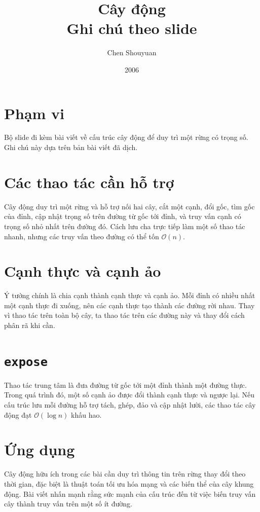 \documentclass[11pt]{article}
\title{Cây động\\{\large Ghi chú theo slide}}
\author{Chen Shouyuan}
\date{2006}
\newcommand{\Oh}{\mathcal{O}}
\begin{document}
\maketitle


\section{Phạm vi}

Bộ slide đi kèm bài viết về cấu trúc cây động để duy trì một rừng có trọng
số. Ghi chú này dựa trên bản bài viết đã dịch.

\section{Các thao tác cần hỗ trợ}

Cây động duy trì một rừng và hỗ trợ nối hai cây, cắt một cạnh, đổi gốc, tìm
gốc của đỉnh, cập nhật trọng số trên đường từ gốc tới đỉnh, và truy vấn cạnh
có trọng số nhỏ nhất trên đường đó. Cách lưu cha trực tiếp làm một số thao tác
nhanh, nhưng các truy vấn theo đường có thể tốn \(\Oh(n)\).

\section{Cạnh thực và cạnh ảo}

Ý tưởng chính là chia cạnh thành cạnh thực và cạnh ảo. Mỗi đỉnh có nhiều nhất
một cạnh thực đi xuống, nên các cạnh thực tạo thành các đường rời nhau. Thay
vì thao tác trên toàn bộ cây, ta thao tác trên các đường này và thay đổi cách
phân rã khi cần.

\section{\texttt{expose}}

Thao tác trung tâm là đưa đường từ gốc tới một đỉnh thành một đường thực.
Trong quá trình đó, một số cạnh ảo được đổi thành cạnh thực và ngược lại. Nếu
cấu trúc lưu mỗi đường hỗ trợ tách, ghép, đảo và cập nhật lười, các thao tác
cây động đạt \(\Oh(\log n)\) khấu hao.

\section{Ứng dụng}

Cây động hữu ích trong các bài cần duy trì thông tin trên rừng thay đổi theo
thời gian, đặc biệt là thuật toán tối ưu hóa mạng và các biến thể của cây
khung động. Bài viết nhấn mạnh rằng sức mạnh của cấu trúc đến từ việc biến
truy vấn cây thành truy vấn trên một số ít đường.
\end{document}
